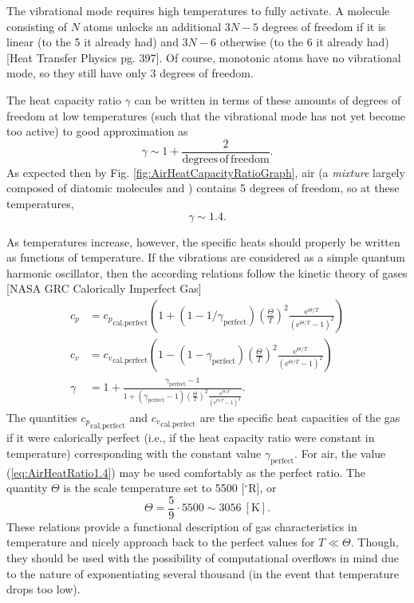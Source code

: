 \documentclass[11pt,dvipsnames]{thesis}
\begin{document}
The vibrational mode requires high temperatures to fully activate. A molecule consisting of $N$ atoms unlocks an additional $3N - 5$ degrees of freedom if it is linear (to the 5 it already had) and $3N - 6$ otherwise (to the 6 it already had) [Heat Transfer Physics pg. 397]. Of course, monotonic atoms have no vibrational mode, so they still have only 3 degrees of freedom.

The heat capacity ratio $\gamma$ can be written in terms of these amounts of degrees of freedom at low temperatures (such that the vibrational mode has not yet become too active) to good approximation as
\begin{equation}
\gamma \sim 1 + \frac{2}{\mathrm{degrees\,of\,freedom}}.
\end{equation}
As expected then by Fig. \ref{fig:AirHeatCapacityRatioGraph}, air (a \textit{mixture} largely composed of diatomic molecules  and ) contains 5 degrees of freedom, so at these temperatures,
\begin{equation}
\gamma \sim 1.4. \label{eq:AirHeatRatio1.4}
\end{equation}

As temperatures increase, however, the specific heats should properly be written as functions of temperature. If the vibrations are considered as a simple quantum harmonic oscillator, then the according relations follow the kinetic theory of gases [NASA GRC Calorically Imperfect Gas]
\begin{align}
c_p &= {c_p}_{\text{cal.perfect}} \left(1 + (1 - 1 / \gamma_{\text{perfect}}) \left(\frac{\Theta}{T}\right)^{\!2} \frac{\mathrm{e}^{\Theta / T}}{(\mathrm{e}^{\Theta / T} - 1)^2}\right) \\
c_v &= {c_v}_{\text{cal.perfect}} \left(1 - (1 - \gamma_{\text{perfect}}) \left(\frac{\Theta}{T}\right)^{\!2} \frac{\mathrm{e}^{\Theta / T}}{(\mathrm{e}^{\Theta / T} - 1)^2}\right) \\
\gamma &= 1 + \frac{\displaystyle\gamma_{\text{perfect}} - 1}{\displaystyle1 + (\gamma_{\text{perfect}} - 1) \left(\frac{\Theta}{T}\right)^{\!2} \frac{\mathrm{e}^{\Theta / T}}{(\mathrm{e}^{\Theta / T} - 1)^2}}.
\end{align}
The quantities ${c_p}_{\text{cal.perfect}}$ and ${c_v}_{\text{cal.perfect}}$ are the specific heat capacities of the gas if it were calorically perfect (i.e., if the heat capacity ratio were constant in temperature) corresponding with the constant value $\gamma_{\text{perfect}}$. For air, the value (\ref{eq:AirHeatRatio1.4}) may be used comfortably as the perfect ratio. The quantity $\Theta$ is the scale temperature set to 5500 [$^\circ\mathrm{R}$], or
\begin{equation}
\Theta = \frac{5}{9} \cdot 5500 \sim 3056 \ [\si{\K}].
\end{equation}
These relations provide a functional description of gas characteristics in temperature and nicely approach back to the perfect values for $T \ll \Theta$. Though, they should be used with the possibility of computational overflows in mind due to the nature of exponentiating several thousand (in the event that temperature drops too low).
\end{document}
